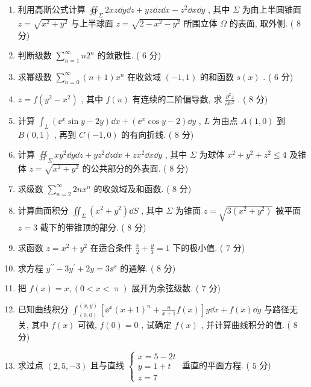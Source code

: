 \begin{enumerate}
	\item 利用高斯公式计算 $\oiint_{\Sigma} 2 x z \dd y \dd z+y z \dd z \dd x-z^{2} \dd x \dd y$ , 其中 $\Sigma$ 为由上半圆锥面 $z=\sqrt{x^{2}+y^{2}}$ 与上半球面 $z=\sqrt{2-x^{2}-y^{2}}$ 所围立体 $\Omega$ 的表面, 取外侧. ( $8$ 分)
	
	\item  判断级数 $\sum_{n=1}^{\infty} n 2^{n}$ 的敛散性. ( $6$ 分)
	
	\item  求幂级数 $\sum_{n=0}^{\infty}(n+1) x^{n}$ 在收敛域 $(-1,1)$ 的和函数 $s(x)$ . ( $6$ 分)
	
	\item $z=f\left(y^{2}-x^{2}\right)$ , 其中 $f(u)$ 有连续的二阶偏导数, 求 $\frac{\partial^{2} z}{\partial x^{2}}$ . ( $8$ 分)
	
	\item 计算 $\int_{L}\left(\ee^{x} \sin y-2 y\right) \dd x+\left(\ee^{x} \cos y-2\right) \dd y$ , $L$ 为由点 $A(1,0)$ 到 $B(0,1)$ , 再到 $C(-1,0)$ 的有向折线. ( $8$ 分)
	
	\item 计算 $\oiint_{\Sigma} x y^{2} \dd y \dd z+y z^{2} \dd z \dd x+z x^{2} \dd x \dd y$ , 其中 $\Sigma$ 为球体 $x^{2}+y^{2}+z^{2} \leq 4$ 及锥体 $z=\sqrt{x^{2}+y^{2}}$ 的公共部分的外表面. ( $8$ 分)
	
	\item 求级数 $\sum_{n=2}^{\infty} 2 n x^{n}$ 的收敛域及和函数. ( $8$ 分)
	
	\item 计算曲面积分 $\iint_{\Sigma}\left(x^{2}+y^{2}\right) \dd S$ , 其中 $\Sigma$ 为锥面 $z=\sqrt{3\left(x^2+y^2\right)}$ 被平面 $z=3$ 截下的带锥顶的部分. ( $8$ 分)
	
	\item 求函数 $z=x^2+y^2$ 在适合条件 $\frac{x}{2}+\frac{y}{3}=1$ 下的极小值. ( $7$ 分)
	
	\item 求方程 $y^{\prime \prime}-3 y^{\prime}+2 y=3 \ee^{x}$ 的通解. ( $8$ 分)
	
	\item 把 $f(x)=x,(0<x<\uppi)$ 展开为余弦级数. ( $7$ 分)
	
	\item 已知曲线积分 $\int_{(0,0)}^{(x, y)}\left[\ee^{x}(x+1)^{n}+\frac{n}{x+1} f(x)\right] y \dd x+f(x) \dd y$ 与路径无关, 其中 $f(x)$ 可微, $f(0)=0$ , 试确定 $f(x)$ , 并计算曲线积分的值. ( $8$ 分)
	
	\item 求过点 $(2,5,-3)$ 且与直线 $\begin{cases}
	x=5-2t\\
	y=1+t\\
	z=7
	\end{cases}$ 垂直的平面方程. ( $5$ 分)
	

\end{enumerate}
